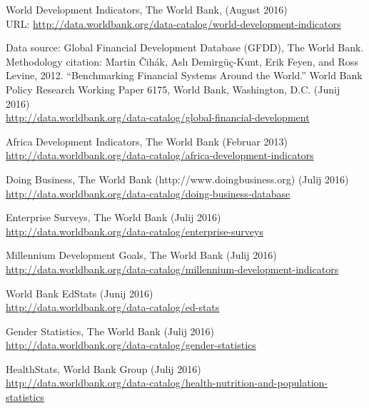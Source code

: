 \begin{thebibliography}{1}


 World Development Indicators, The World Bank, (August 2016)
\\ URL: \url{http://data.worldbank.org/data-catalog/world-development-indicators}

 Data source: Global Financial Development Database (GFDD), The World Bank. Methodology citation: Martin Čihák, Aslı Demirgüç-Kunt, Erik Feyen, and Ross Levine, 2012. ``Benchmarking Financial Systems Around the World.'' World Bank Policy Research Working Paper 6175, World Bank, Washington, D.C. (Junij 2016)
\\ \url{http://data.worldbank.org/data-catalog/global-financial-development}


 Africa Development Indicators, The World Bank (Februar 2013)
\\ \url{http://data.worldbank.org/data-catalog/africa-development-indicators}

 Doing Business, The World Bank (http://www.doingbusiness.org) (Julij 2016)
\\ \url{http://data.worldbank.org/data-catalog/doing-business-database}

 Enterprise Surveys, The World Bank (Julij 2016)
\\ \url{http://data.worldbank.org/data-catalog/enterprise-surveys}

 Millennium Development Goals, The World Bank (Julij 2016)
\\ \url{http://data.worldbank.org/data-catalog/millennium-development-indicators}

 World Bank EdStats (Junij 2016)
\\ \url{http://data.worldbank.org/data-catalog/ed-stats}

 Gender Statistics, The World Bank (Julij 2016)
\\ \url{http://data.worldbank.org/data-catalog/gender-statistics}

 HealthStats, World Bank Group (Julij 2016)
\\ \url{http://data.worldbank.org/data-catalog/health-nutrition-and-population-statistics}


\end{thebibliography}

